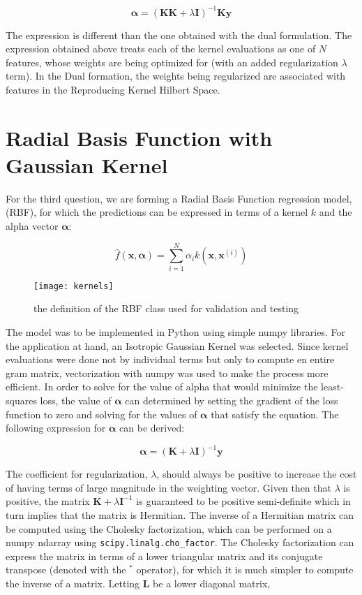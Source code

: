 \documentclass{article}
\begin{document}
\begin{equation}
\boldsymbol\alpha = (\mathbf{KK} + \lambda \mathbf{I})^{-1}\mathbf{Ky}
\end{equation}

The expression is different than the one obtained with the dual formulation. The expression obtained above treats each of the kernel evaluations as one of $N$ features, whose weights are being optimized for (with an added regularization $\lambda$ term). In the Dual formation, the weights being regularized are associated with features in the Reproducing Kernel Hilbert Space.

\iftrue
\section{Radial Basis Function with Gaussian Kernel}
For the third question, we are forming a Radial Basis Function regression model, (RBF), for which the predictions can be expressed in terms of a kernel $k$ and the alpha vector $\boldsymbol\alpha$:

\begin{equation}
\hat{f}(\mathbf{x}, \boldsymbol\alpha) = \sum_{i=1}^{N} \alpha_i k(\mathbf{x}, \mathbf{x}^{(i)})
\end{equation}


\begin{figure}[H]
\centering
\texttt{[image: kernels]}
\caption{the definition of the RBF class used for validation and testing}
\end{figure}

The model was to be implemented in Python using simple numpy libraries. For the application at hand, an Isotropic Gaussian Kernel was selected. Since kernel evaluations were done not by individual terms but only to compute en entire gram matrix, vectorization with numpy was used to make the process more efficient. In order to solve for the value of alpha that would minimize the least-squares loss, the value of $\boldsymbol\alpha$ can determined by setting the gradient of the loss function to zero and solving for the values of $\boldsymbol\alpha$ that satisfy the equation. The following expression for $\boldsymbol\alpha$ can be derived:

\begin{equation}
\boldsymbol\alpha = (\mathbf{K} + \lambda \mathbf{I})^{-1} \mathbf{y}
\end{equation}

The coefficient for regularization, $\lambda$, should always be positive to increase the cost of having terms of large magnitude in the weighting vector. Given then that $\lambda$ is positive, the matrix $\mathbf{K} + \lambda \mathbf{I}^{-1}$ is guaranteed to be positive semi-definite which in turn implies that the matrix is Hermitian. The inverse of a Hermitian matrix can be computed using the Cholesky factorization, which can be performed on a numpy ndarray using \verb+scipy.linalg.cho_factor+. The Cholesky factorization can express the matrix in terms of a lower triangular matrix and its conjugate transpose (denoted with the $^*$ operator), for which it is much simpler to compute the inverse of a matrix. Letting $\mathbf{L}$ be a lower diagonal matrix,
\end{document}
